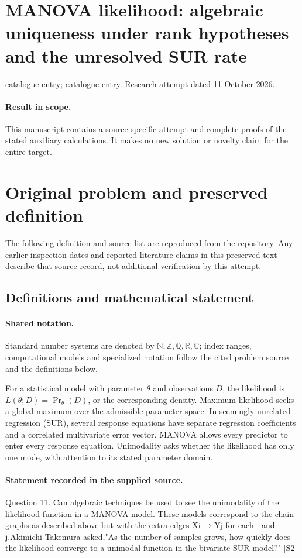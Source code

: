 \documentclass[11pt]{article}
\begin{document}
\section*{MANOVA likelihood: algebraic uniqueness under rank hypotheses and the unresolved SUR rate}
\noindent catalogue entry; catalogue entry. Research attempt dated 11 October 2026.
\paragraph{Result in scope.}This manuscript contains a source-specific attempt and complete proofs of the stated auxiliary calculations. It makes no new solution or novelty claim for the entire target.
\section{Original problem and preserved definition}
The following definition and source list are reproduced from the repository. Any earlier inspection dates and reported literature claims in this preserved text describe that source record, not additional verification by this attempt.
\subsection{Definitions and mathematical statement}

\paragraph{Shared notation.}Standard number systems are denoted by $\mathbb N,\mathbb Z,\mathbb Q,\mathbb R,\mathbb C$; index ranges, computational models and specialized notation follow the cited problem source and the definitions below.


For a statistical model with parameter $\theta$ and observations $D$, the likelihood is $L(\theta;D)=\Pr_\theta(D)$, or the corresponding density. Maximum likelihood seeks a global maximum over the admissible parameter space. In seemingly unrelated regression (SUR), several response equations have separate regression coefficients and a correlated multivariate error vector. MANOVA allows every predictor to enter every response equation. Unimodality asks whether the likelihood has only one mode, with attention to its stated parameter domain.
\paragraph{Statement recorded in the supplied source.}
Question 11. Can algebraic techniques be used to see the unimodality of the likelihood function in a MANOVA model. These models correspond to the chain graphs as described above but with the extra edges Xi → Yj for each i and j.Akimichi Takemura asked,"As the number of samples grows, how quickly does the likelihood converge to a unimodal function in the bivariate SUR model?" \href{https://aimath.org/WWN/compalgstat/compalgstat.pdf}{[S2]}
\end{document}
